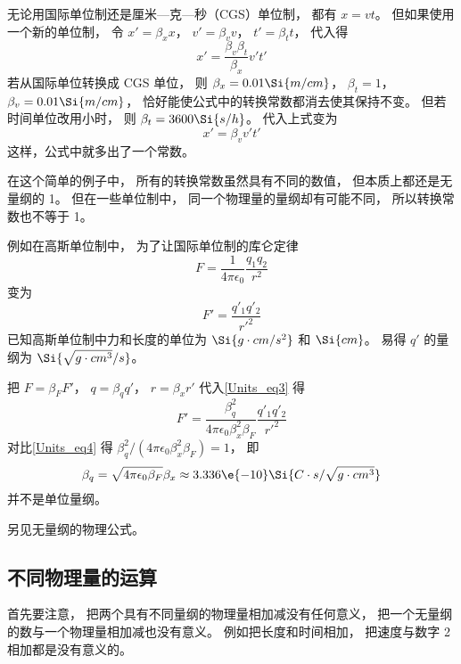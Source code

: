 \begin{example}{}
无论用国际单位制还是厘米—克—秒（CGS）单位制， 都有 $x = vt$。 但如果使用一个新的单位制， 令 $x' = \beta_x x$， $v' = \beta_v v$， $t' = \beta_t t$， 代入得
\begin{equation}
x' = \frac{\beta_v\beta_t}{\beta_x} v' t'
\end{equation}
若从国际单位转换成 CGS 单位， 则 $\beta_x = 0.01 \Si{m/cm}$， $\beta_t = 1$， $\beta_v = 0.01 \Si{m/cm}$， 恰好能使公式中的转换常数都消去使其保持不变。 但若时间单位改用小时， 则 $\beta_t = 3600 \Si{s/h}$。 代入上式变为
\begin{equation}
x' = \beta_v v' t'
\end{equation}
这样，公式中就多出了一个常数。
\end{example}
在这个简单的例子中， 所有的转换常数虽然具有不同的数值， 但本质上都还是无量纲的 1。 但在一些单位制中， 同一个物理量的量纲却有可能不同， 所以转换常数也不等于 1。
\begin{example}{}
例如在高斯单位制中， 为了让国际单位制的库仑定律
\begin{equation}\label{Units_eq3}
F = \frac{1}{4\pi\epsilon_0}\frac{q_1 q_2}{r^2}
\end{equation}
变为
\begin{equation}\label{Units_eq4}
F' = \frac{q'_1 q'_2}{r'^2}
\end{equation}
已知高斯单位制中力和长度的单位为 $\Si{g\cdot cm/s^2}$ 和 $\Si{cm}$。 易得 $q'$ 的量纲为 $\Si{\sqrt{g\cdot cm^3}/s}$。

把 $F = \beta_F F'$， $q = \beta_q q'$， $r = \beta_x r'$ 代入\autoref{Units_eq3} 得
\begin{equation}
F' =  \frac{\beta_q^2}{4\pi\epsilon_0\beta_x^2 \beta_F}\frac{q'_1 q'_2}{r'^2}
\end{equation}
对比\autoref{Units_eq4} 得 $\beta_q^2/(4\pi\epsilon_0\beta_x^2 \beta_F) = 1$， 即
\begin{equation}
\beta_q = \sqrt{4\pi\epsilon_0 \beta_F} \beta_x \approx 3.336\e{-10} \Si{C\cdot s/\sqrt{g\cdot cm^3}}
\end{equation}
并不是单位量纲。
\end{example}

另见无量纲的物理公式。

\subsection{不同物理量的运算}
首先要注意， 把两个具有不同量纲的物理量相加减没有任何意义， 把一个无量纲的数与一个物理量相加减也没有意义。 例如把长度和时间相加， 把速度与数字 2 相加都是没有意义的。

